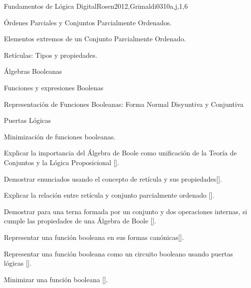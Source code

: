 \begin{syllabus}
\begin{unit}{Fundamentos de Lógica Digital}{}{Rosen2012,Grimaldi03}{10}{a,j,1,6}
   \begin{topics}
	\item Órdenes Parciales y Conjuntos Parcialmente Ordenados.
 	\item Elementos extremos de un Conjunto Parcialmente Ordenado.
	\item Retículas: Tipos y propiedades.
	\item Álgebras Booleanas
	\item Funciones y expresiones Boolenas
	\item Representación de Funciones Booleanas: Forma Normal Disyuntiva y Conjuntiva
	\item Puertas Lógicas
	\item Minimización de funciones booleanas.
   \end{topics}
   \begin{learningoutcomes}
	\item Explicar la importancia del Álgebra de Boole como unificación de la Teoría de Conjuntos y la Lógica Proposicional [\Familiarity].
	\item Demostrar enunciados usando el concepto de retícula y sus propiedades[\Assessment].
	\item Explicar la relación entre retícula y conjunto parcialmente ordenado [\Familiarity].
	\item Demostrar para una terna formada por un conjunto y dos operaciones internas, si cumple las propiedades de una Álgebra de Boole [\Assessment].
	\item Representar una función booleana en sus formas canónicas[\Usage].
	\item Representar una función booleana como un circuito booleano usando puertas lógicas  [\Usage].
	\item Minimizar una función booleana [\Usage].
    \end{learningoutcomes}
 \end{unit}

\begin{coursebibliography}
\end{coursebibliography}

\end{syllabus}

%
